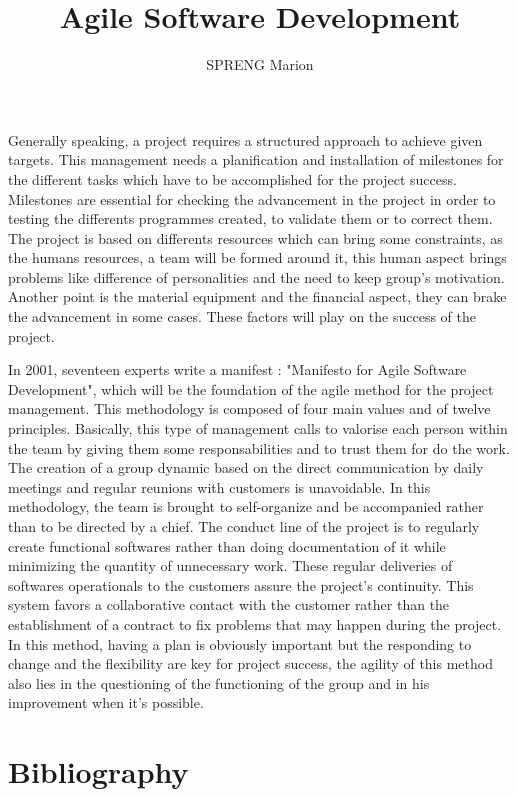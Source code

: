 \documentclass[english,12pt]{article}
\title{Agile Software Development}
\author{SPRENG Marion}
\begin{document}
\maketitle

Generally speaking, a project requires a structured approach to achieve given targets. This management needs a planification and installation of milestones for the different tasks which have to be accomplished for the project success.
Milestones are essential for checking the advancement in the project in order to testing the differents programmes created, to validate them or to correct them.
The project is based on differents resources which can bring some constraints, as the humans resources, a team will be formed around it, this human aspect brings problems like difference of personalities and the need to keep group's motivation.
Another point is the material equipment and the financial aspect, they can brake the advancement in some cases.
These factors will play on the success of the project.\newline

In 2001, seventeen experts write a manifest : "Manifesto for Agile Software Development", which will be the foundation of the agile method for the project management.
This methodology is composed of four main values and of twelve principles.
Basically, this type of management calls to valorise each person within the team by giving them some responsabilities and to trust them for do the work.
The creation of a group dynamic based on the direct communication by daily meetings and regular reunions with customers is unavoidable. 
In this methodology, the team is brought to self-organize and be accompanied rather than to be directed by a chief.
The conduct line of the project is to regularly create functional softwares rather than doing documentation of it while minimizing the quantity of unnecessary work. These regular deliveries of softwares operationals to the customers   assure the project's continuity.
This system favors a collaborative contact with the customer rather than the establishment of a contract to fix problems that may happen during the project.
In this method, having a plan is obviously important but the responding to change and the flexibility are key for project success, the agility of this method also lies in the questioning of the functioning of the group and in his improvement when it's possible.

\section{Bibliography}
\nocite{*}


\end{document}
